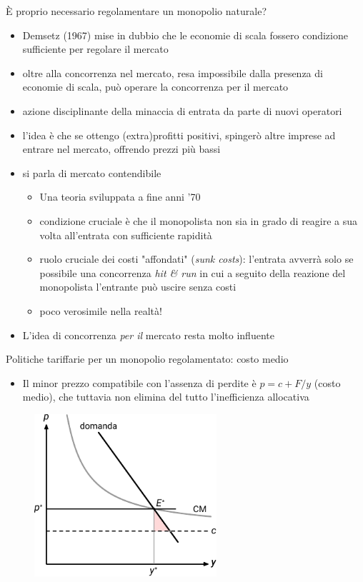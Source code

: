 \documentclass[aspectratio=64,11pt]{beamer}
\begin{document}
\begin{frame}{È proprio necessario regolamentare un monopolio naturale?}
\begin{itemize}
\item Demsetz (1967) mise in dubbio che le economie di scala fossero condizione
\alert{sufficiente} per regolare il mercato
\item oltre alla concorrenza \alert{nel} mercato, resa impossibile dalla presenza di
economie di scala, può operare la concorrenza \alert{per il} mercato
\item azione disciplinante della minaccia di entrata da parte di nuovi operatori
\item l'idea è che se ottengo (extra)profitti positivi, spingerò altre imprese ad
entrare nel mercato, offrendo prezzi più bassi
\item si parla di \alert{mercato contendibile}
\begin{itemize}
\item Una teoria sviluppata a fine anni '70
\item condizione cruciale è che il monopolista non sia in grado di reagire a
sua volta all'entrata con sufficiente rapidità
\item ruolo cruciale dei costi "affondati" (\emph{sunk costs}): l'entrata avverrà
solo se possibile una concorrenza \emph{hit \& run} in cui a seguito della
reazione del monopolista l'entrante può uscire senza costi
\item poco verosimile nella realtà!
\end{itemize}
\item L'idea di concorrenza \emph{per il} mercato resta molto influente
\end{itemize}
\end{frame}

\begin{frame}{Politiche tariffarie per un monopolio regolamentato: costo medio}
\begin{itemize}
\item Il minor prezzo compatibile con l'assenza di perdite è $p=c+F/y$ (\alert{costo medio}),
che tuttavia non elimina del tutto l'inefficienza allocativa
\end{itemize}

\begin{figure}[htbp]
\centering
\includegraphics[height=6cm]{./figure/monopolio-naturale-4-color.pdf}
\end{figure}
\end{frame}
\end{document}
